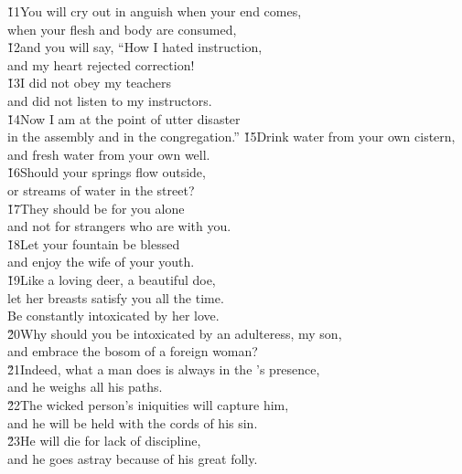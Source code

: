 \begin{poetry}
\poeml \v{11}You will cry out in anguish when your end comes, \\
\poemll    when your flesh and body are consumed, \\
\poeml \v{12}and you will say, ``How I hated instruction, \\
\poemll    and my heart rejected correction! \\
\poeml \v{13}I did not obey my teachers \\
\poemll    and did not listen to my instructors. \\
\poeml \v{14}Now I am at the point of utter disaster \\
\poemll    in the assembly and in the congregation.''
\poeml \v{15}Drink water from your own cistern, \\
\poemll    and fresh water from your own well. \\
\poeml \v{16}Should your springs flow outside, \\
\poemll    or streams of water in the street? \\
\poeml \v{17}They should be for you alone \\
\poemll    and not for strangers who are with you. \\
\poeml \v{18}Let your fountain be blessed \\
\poemll    and enjoy the wife of your youth. \\
\poeml \v{19}Like a loving deer, a beautiful doe, \\
\poemll    let her breasts satisfy you all the time. \\
\poemlll       Be constantly intoxicated by her love. \\
\poeml \v{20}Why should you be intoxicated by an adulteress, my son, \\
\poemll    and embrace the bosom of a foreign woman? \\
\poeml \v{21}Indeed, what a man does is always in the 's presence, \\
\poemll    and he weighs all his paths. \\
\poeml \v{22}The wicked person's iniquities will capture him, \\
\poemll    and he will be held with the cords of his sin. \\
\poeml \v{23}He will die for lack of discipline, \\
\poemll    and he goes astray because of his great folly.
\end{poetry}

